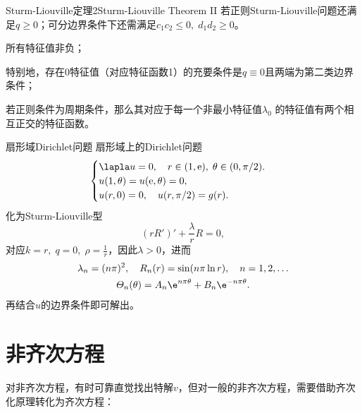 \begin{theorem}{Sturm-Liouville定理2}{Sturm-Liouville Theorem II}
	若正则Sturm-Liouville问题还满足$q\geqslant 0$；可分边界条件下还需满足$c_1c_2\leqslant 0,\;d_1d_2\geqslant 0$。
	\begin{compactenum}
		\item 所有特征值非负；

		      特别地，存在0特征值（对应特征函数1）的充要条件是$q\equiv 0$且两端为第二类边界条件；
		\item 若正则条件为周期条件，那么其对应于每一个非最小特征值$\lambda_0$
		的特征值有两个相互正交的特征函数。
	\end{compactenum}
\end{theorem}
\begin{example}{扇形域Dirichlet问题}{}
	扇形域上的Dirichlet问题
	\begin{align*}
		\begin{cases}
			\lapla u=0,\quad r\in(1,\mathrm e),\;\theta\in(0,\pi/2).\\
			u(1,\theta)=u(\mathrm e,\theta)=0,\\
			u(r,0)=0,\quad u(r,\pi/2)=g(r).
		\end{cases}
	\end{align*}
	化为Sturm-Liouville型
	\[
		(rR')'+\frac{\lambda}rR=0,
	\]
	对应\(k=r,\;q=0,\;\rho=\frac1r\)，因此\(\lambda>0\)，进而
	\begin{gather*}
		\lambda_n=(n\pi)^2,\quad R_n(r)=\sin(n\pi\ln r),\quad n=1,2,\ldots
		\\
		\varTheta_n(\theta)=A_n\e^{n\pi\theta}+B_n\e^{-n\pi\theta}.
	\end{gather*}
	再结合$u$的边界条件即可解出。
\end{example}

\section{非齐次方程}

对非齐次方程，有时可靠直觉找出特解$v$，但对一般的非齐次方程，需要借助齐次化原理转化为齐次方程：

